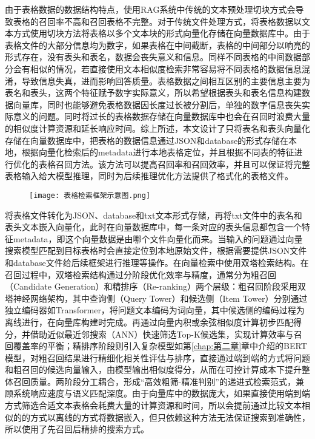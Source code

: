 由于表格数据的数据结构特点，使用RAG系统中传统的文本预处理切块方式会导致表格的召回率不高和召回表格不完整。对于传统文件处理方式，将表格数据以文本方式使用切块方法将表格以多个文本块的形式向量化存储在向量数据库中。由于表格文件的大部分信息均为数字，如果表格在中间截断，表格的中间部分以响亮的形式存在，没有表头和表名，数据会丧失意义和信息。同样不同表格的中间数据部分会有相似的情况，若直接使用文本相似度检索非常容易将不同表格的数据信息混淆，导致信息失真，进而影响回答质量。表格数据之间相互区别的主要信息主要为表名和表头，这两个特征赋予数字实际意义，所以希望根据表头和表名信息构建数据向量库，同时也能够避免表格数据因长度过长被分割后，单独的数字信息丧失实际意义的问题。同时将过长的表格数据存储在向量数据库中也会在召回时浪费大量的相似度计算资源和延长响应时间。综上所述，本文设计了只将表名和表头向量化存储在向量数据库中，把表格的数据信息通过JSON和database的形式存储在本地，根据向量化检索后的metadata进行本地表格定位，并且根据不同表的特征进行优化的表格召回方法。该方法可以提高召回率和召回效率，并且可以保证将完整表格输入给大模型推理，同时为后续推理优化方法提供了格式化的表格文件。
\begin{figure}[!htbp]
    \centering
    \texttt{[image: 表格检索框架示意图.png]}
    \label{fig:4-2}
\end{figure}
将表格文件转化为JSON、database和txt文本形式存储，再将txt文件中的表名和表头文本嵌入向量化，此时在向量数据库中，每一条对应的表头信息都包含一个特征metadata，即这个向量数据是由哪个文件向量化而来。当输入的问题通过向量搜索模型匹配到目标表格时会直接定位到本地原始文件，根据需要提供JSON文件和database文件给后续框架进行推理等操作。在向量检索中使用双塔检索结构\cite{bahdanau2015neural,sutskever2014sequence,fan2018hierarchical,holtzmancurious}。在召回过程中，双塔检索结构通过分阶段优化效率与精度，通常分为粗召回（Candidate Generation）和精排序（Re-ranking）两个层级：粗召回阶段采用双塔神经网络架构，其中查询侧（Query Tower）和候选侧（Item Tower）分别通过独立编码器如Transformer，将问题文本编码为词向量，其中候选侧的编码过程为离线进行，在向量库构建时完成。再通过向量内积或余弦相似度计算初步匹配得分，并借助近似最近邻搜索（ANN）快速筛选Top-K候选集，实现计算效率与召回覆盖率的平衡；精排序阶段则引入复杂模型如第\ref{chap:第二章}章中介绍的BERT模型，对粗召回结果进行精细化相关性评估与排序，直接通过端到端的方式将问题和粗召回的候选向量输入，由模型输出相似度得分，从而在可控计算成本下提升整体召回质量。两阶段分工耦合，形成“高效粗筛-精准判别”的递进式检索范式，兼顾系统响应速度与语义匹配深度。由于向量库中的数据庞大，如果直接使用端到端方式筛选合适文本表格会耗费大量的计算资源和时间，所以会提前通过比较文本相似的的方式以离线的方式将数据嵌入，但只依赖这种方法无法保证搜索到准确性，所以使用了先召回后精排的搜索方式。
